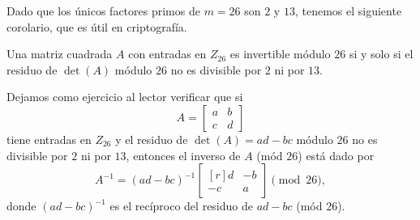 Dado que los únicos factores primos de $m = 26$ son $2$ y $13$, tenemos el siguiente corolario, que es útil en criptografía.

\begin{corollary}{}{}
    Una matriz cuadrada $A$ con entradas en $Z_{26}$ es invertible módulo $26$ si y solo si el residuo de $\det(A)$ módulo $26$ no es divisible por $2$ ni por $13$.
\end{corollary}

Dejamos como ejercicio al lector verificar que si
$$A = \begin{bmatrix}
    a & b \\
    c & d
\end{bmatrix}$$
tiene entradas en $Z_{26}$ y el residuo de $\det(A) = ad - bc$ módulo $26$ no es divisible por $2$ ni por $13$, entonces el inverso de $A$ (mód $26$) está dado por
\begin{equation}
    A^{-1} = (ad - bc)^{-1} \begin{bmatrix*}[r]
        d & -b \\
        -c & a
    \end{bmatrix*} \pmod{26}, \label{Hill1}
\end{equation}
donde $(ad - bc)^{-1}$ es el recíproco del residuo de $ad - bc$ (mód $26$).

